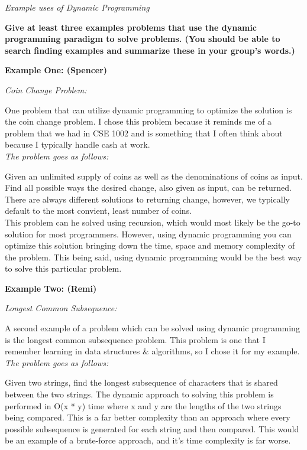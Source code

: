 \documentclass{article}
\begin{document}
\bigskip

\noindent \textit{Example uses of Dynamic Programming}


\textbf{Give at least three examples problems that use the dynamic programming
paradigm to solve problems. (You should be able to search
finding examples and summarize these in your group’s words.)}

\bigskip

\noindent \textbf{Example One: (Spencer)}

\noindent \textit{Coin Change Problem:}

One problem that can utilize dynamic programming to optimize the
solution is the coin change problem. I chose this problem because 
it reminds me of a problem that we had in CSE 1002 and is something
that I often think about because I typically handle cash at work.\\

\noindent \textit{The problem goes as follows:}

Given an unlimited supply of coins as well as the denominations of
coins as input. Find all possible ways the desired change, also given 
as input, can be returned. There are always different solutions to
returning change, however, we typically default to the most convient,
least number of coins.\\

This problem can he solved using recursion, which would most likely be
the go-to solution for most programmers. However, using dynamic programming
you can optimize this solution bringing down the time, space and memory
complexity of the problem. This being said, using dynamic programming would
be the best way to solve this particular problem.

\bigskip

\noindent \textbf{Example Two: (Remi)}

\noindent \textit{Longest Common Subsequence:}

A second example of a problem which can be solved using dynamic programming 
is the longest common subsequence problem. This problem is one that I 
remember learning in data structures $\&$ algorithms, so I chose it for my 
example.\\

\noindent \textit{The problem goes as follows:}

Given two strings, find the longest subsequence of characters that is 
shared between the two strings. The dynamic approach to solving this problem
is performed in O(x * y) time where x and y are the lengths of the two 
strings being compared. This is a far better complexity than an approach 
where every possible subsequence is generated for each string and then 
compared. This would be an example of a brute-force approach, and it's time 
complexity is far worse.
\end{document}
